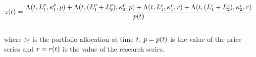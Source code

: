 \documentclass{article}
\begin{document}
\begin{equation}
z(t) = \frac{\Lambda(t, L_{1}^{p}, \kappa_{1}^{p}, p)+\Lambda(t, (L_{1}^{p} + L_{2}^{p}), \kappa_{2}^{p},p)+\Lambda(t, L_{1}^{r}, \kappa_{1}^{r}, r)+\Lambda(t, (L_{1}^{r} + L_{2}^{r}), \kappa_{2}^{r}, r)}{p(t)}
\end{equation}\\

\noindent where $z_t$ is the portfolio allocation at time $t$, $p = p(t)$ is the value of the price series and $r = r(t)$ is the value of the research series.

\hspace{200mm}
\hspace{200mm}

\keyterms
\furtherlinks
\end{document}

